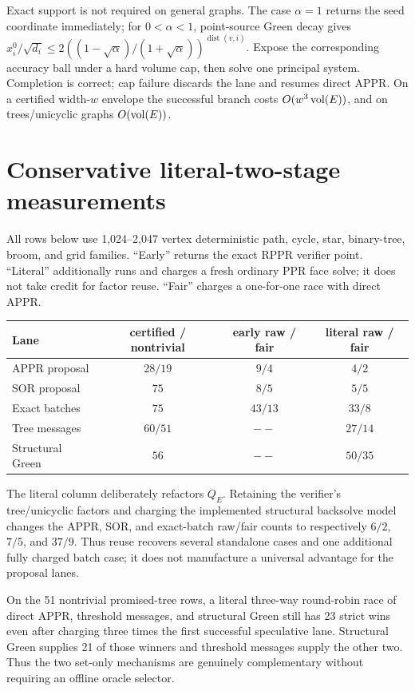 Exact support is not required on general graphs.  The case $\alpha=1$ returns
the seed coordinate immediately; for $0<\alpha<1$, point-source Green decay
gives
$x_i^0/\sqrt{d_i}\leq
2((1-\sqrt\alpha)/(1+\sqrt\alpha))^{\operatorname{dist}(v,i)}$.
Expose the corresponding accuracy ball under a hard volume cap, then solve
one principal system.  Completion is correct; cap failure discards the lane
and resumes direct APPR.  On a certified width-$w$ envelope the successful
branch costs $O(w^3\operatorname{vol}(E))$, and on trees/unicyclic graphs $O(\operatorname{vol}(E))$.



\section{Conservative literal-two-stage measurements}

All rows below use 1,024--2,047 vertex deterministic path, cycle, star,
binary-tree, broom, and grid families.  ``Early'' returns the exact RPPR
verifier point.  ``Literal'' additionally runs and charges a fresh ordinary
PPR face solve; it does not take credit for factor reuse.  ``Fair'' charges a
one-for-one race with direct APPR.

\begin{center}
\small
\begin{tabular}{@{}lccc@{}}
\toprule
Lane & certified / nontrivial & early raw / fair & literal raw / fair \\
\midrule
APPR proposal & $28/19$ & $9/4$ & $4/2$ \\
SOR proposal & $75$ & $8/5$ & $5/5$ \\
Exact batches & $75$ & $43/13$ & $33/8$ \\
Tree messages & $60/51$ & $--$ & $27/14$ \\
Structural Green & $56$ & $--$ & $50/35$ \\
\bottomrule
\end{tabular}
\end{center}

The literal column deliberately refactors $Q_E$.  Retaining the verifier's
tree/unicyclic factors and charging the implemented structural backsolve
model changes the APPR, SOR, and exact-batch raw/fair counts to respectively
$6/2$, $7/5$, and $37/9$.  Thus reuse recovers several standalone cases and
one additional fully charged batch case; it does not manufacture a universal
advantage for the proposal lanes.

On the 51 nontrivial promised-tree rows, a literal three-way round-robin race
of direct APPR, threshold messages, and structural Green still has 23 strict
wins even after charging three times the first successful speculative lane.
Structural Green supplies 21 of those winners and threshold messages supply
the other two.  Thus the two set-only mechanisms are genuinely complementary
without requiring an offline oracle selector.

